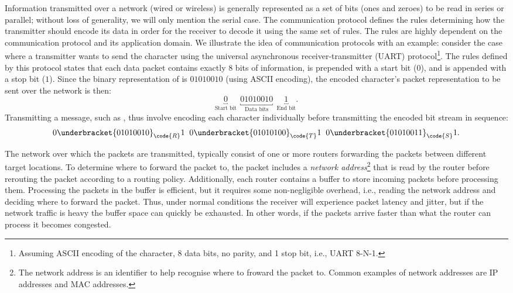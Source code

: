 Information transmitted over a network (wired or wireless) is generally represented as a set of bits (ones and zeroes) to be read in series or parallel; without loss of generality, we will only mention the serial case.
The communication protocol defines the rules determining how the transmitter should encode its data in order for the receiver to decode it using the same set of rules.
The rules are highly dependent on the communication protocol and its application domain.
We illustrate the idea of communication protocols with an example: consider the case where a transmitter wants to send the character  using the universal asynchronous receiver-transmitter (UART) protocol\footnote{Assuming ASCII encoding of the character, 8 data bits, no parity, and 1 stop bit, i.e., UART 8-N-1.}.
The rules defined by this protocol states that each data packet contains exactly 8 bits of information, is prepended with a start bit ($0$), and is appended with a stop bit ($1$).
Since the binary representation of  is $01010010$ (using ASCII encoding), the encoded character's packet representation to be sent over the network is then:
%
\begin{equation*}
    \underbracket{0}_{\text{Start bit}} \;\, \underbracket{01010010}_{\text{Data bits}} \;\, \underbracket{1}_{\text{End bit}}.
\end{equation*}
%
Transmitting a message, such as , thus involve encoding each character individually before transmitting the encoded bit stream in sequence:
%
\begin{equation*}
    0\underbracket{01010010}_{\code{R}}1 \;\;
    0\underbracket{01010100}_{\code{T}}1 \;\;
    0\underbracket{01010011}_{\code{S}}1.
\end{equation*}

The network over which the packets are transmitted, typically consist of one or more routers forwarding the packets between different target locations.
To determine where to forward the packet to, the packet includes a \emph{network address}\footnote{The network address is an identifier to help recognise where to froward the packet to. Common examples of network addresses are IP addresses and MAC addresses.} that is read by the router before rerouting the packet according to a routing policy.
Additionally, each router contains a buffer to store incoming packets before processing them.
Processing the packets in the buffer is efficient, but it requires some non-negligible overhead, i.e., reading the network address and deciding where to forward the packet.
Thus, under normal conditions the receiver will experience packet latency and jitter, but if the network traffic is heavy the buffer space can quickly be exhausted.
In other words, if the packets arrive faster than what the router can process it becomes congested.

